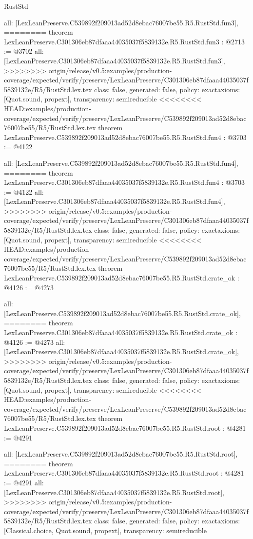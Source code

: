 \begin{lexlean}{RustStd}
\begin{coremodule}
{\begin{coremodule}
{{{{{{  all: [LexLeanPreserve.C539892f209013ad52d8ebac76007be55.R5.RustStd.fun3],
========
theorem LexLeanPreserve.C301306eb87dfaaa44035037f5839132e.R5.RustStd.fun3 : @2713 := @3702 {
  all: [LexLeanPreserve.C301306eb87dfaaa44035037f5839132e.R5.RustStd.fun3],
>>>>>>>> origin/release/v0.5:examples/production-coverage/expected/verify/preserve/LexLeanPreserve/C301306eb87dfaaa44035037f5839132e/R5/RustStd.lex.tex
  class: false,
  generated: false,
  policy: exact{axioms: [Quot.sound, propext]},
  transparency: semireducible
}
<<<<<<<< HEAD:examples/production-coverage/expected/verify/preserve/LexLeanPreserve/C539892f209013ad52d8ebac76007be55/R5/RustStd.lex.tex
theorem LexLeanPreserve.C539892f209013ad52d8ebac76007be55.R5.RustStd.fun4 : @3703 := @4122 {
  all: [LexLeanPreserve.C539892f209013ad52d8ebac76007be55.R5.RustStd.fun4],
========
theorem LexLeanPreserve.C301306eb87dfaaa44035037f5839132e.R5.RustStd.fun4 : @3703 := @4122 {
  all: [LexLeanPreserve.C301306eb87dfaaa44035037f5839132e.R5.RustStd.fun4],
>>>>>>>> origin/release/v0.5:examples/production-coverage/expected/verify/preserve/LexLeanPreserve/C301306eb87dfaaa44035037f5839132e/R5/RustStd.lex.tex
  class: false,
  generated: false,
  policy: exact{axioms: [Quot.sound, propext]},
  transparency: semireducible
}
<<<<<<<< HEAD:examples/production-coverage/expected/verify/preserve/LexLeanPreserve/C539892f209013ad52d8ebac76007be55/R5/RustStd.lex.tex
theorem LexLeanPreserve.C539892f209013ad52d8ebac76007be55.R5.RustStd.crate_ok : @4126 := @4273 {
  all: [LexLeanPreserve.C539892f209013ad52d8ebac76007be55.R5.RustStd.crate_ok],
========
theorem LexLeanPreserve.C301306eb87dfaaa44035037f5839132e.R5.RustStd.crate_ok : @4126 := @4273 {
  all: [LexLeanPreserve.C301306eb87dfaaa44035037f5839132e.R5.RustStd.crate_ok],
>>>>>>>> origin/release/v0.5:examples/production-coverage/expected/verify/preserve/LexLeanPreserve/C301306eb87dfaaa44035037f5839132e/R5/RustStd.lex.tex
  class: false,
  generated: false,
  policy: exact{axioms: [Quot.sound, propext]},
  transparency: semireducible
}
<<<<<<<< HEAD:examples/production-coverage/expected/verify/preserve/LexLeanPreserve/C539892f209013ad52d8ebac76007be55/R5/RustStd.lex.tex
theorem LexLeanPreserve.C539892f209013ad52d8ebac76007be55.R5.RustStd.root : @4281 := @4291 {
  all: [LexLeanPreserve.C539892f209013ad52d8ebac76007be55.R5.RustStd.root],
========
theorem LexLeanPreserve.C301306eb87dfaaa44035037f5839132e.R5.RustStd.root : @4281 := @4291 {
  all: [LexLeanPreserve.C301306eb87dfaaa44035037f5839132e.R5.RustStd.root],
>>>>>>>> origin/release/v0.5:examples/production-coverage/expected/verify/preserve/LexLeanPreserve/C301306eb87dfaaa44035037f5839132e/R5/RustStd.lex.tex
  class: false,
  generated: false,
  policy: exact{axioms: [Classical.choice, Quot.sound, propext]},
  transparency: semireducible
}

}}}}}}}}}
\end{coremodule}}
\end{coremodule}
\end{lexlean}
